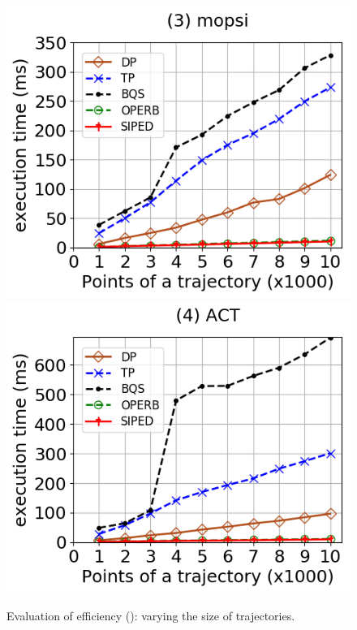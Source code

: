 \begin{figure}[tb!]
	\includegraphics[scale=0.315]{Figures/Exp-PED-time-size-mopsi.png}	\hspace{1ex}
	\includegraphics[scale=0.315]{Figures/Exp-PED-time-size-zh.png}	\hspace{1ex}
	\vspace{-2.5ex}
	\caption{\small Evaluation of efficiency (\ped): varying the size of trajectories.}\label{fig:time-size-ped}
	\vspace{-2ex}
\end{figure}

